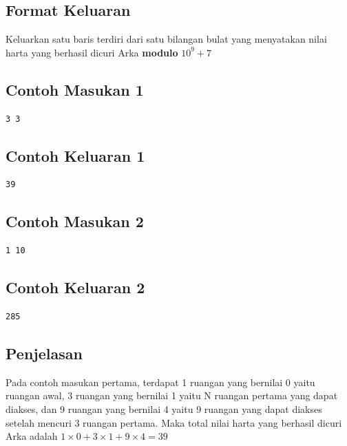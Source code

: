 \documentclass{article}
\begin{document}
\subsection*{Format Keluaran}
Keluarkan satu baris terdiri dari satu bilangan bulat yang menyatakan nilai harta yang berhasil dicuri Arka \textbf{modulo} $10^9 + 7$

\begin{multicols}{2}
\subsection*{Contoh Masukan 1}
\begin{lstlisting}
3 3
\end{lstlisting}
\columnbreak

\subsection*{Contoh Keluaran 1}
\begin{lstlisting}
39
\end{lstlisting}
\end{multicols}

\begin{multicols}{2}
\subsection*{Contoh Masukan 2}
\begin{lstlisting}
1 10
\end{lstlisting}
\columnbreak

\subsection*{Contoh Keluaran 2}
\begin{lstlisting}
285
\end{lstlisting}
\end{multicols}

\subsection*{Penjelasan}

Pada contoh masukan pertama, terdapat 1 ruangan yang bernilai 0 yaitu ruangan awal, 3 ruangan yang bernilai 1 yaitu N ruangan pertama yang dapat diakses, dan 9 ruangan yang bernilai 4 yaitu 9 ruangan yang dapat diakses setelah mencuri 3 ruangan pertama. Maka total nilai harta yang berhasil dicuri Arka adalah $1 \times 0 + 3 \times 1 + 9 \times 4 = 39$
\end{document}
